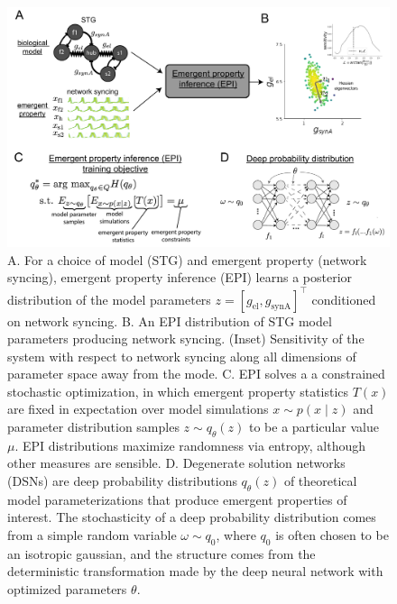 \documentclass[11pt]{article}
\begin{document}

\begin{figure}
\begin{center}
\includegraphics[scale=0.4]{figs/fig2/fig2.pdf}
\end{center}
\caption{A. For a choice of model (STG) and emergent property (network syncing), emergent property inference (EPI) learns a posterior distribution of the model parameters  $z = \left[g_{\text{el}}, g_{\text{synA}} \right]^\top$ conditioned on network syncing. B. An EPI distribution of STG model parameters producing network syncing.  (Inset) Sensitivity of the system with respect to network syncing along all dimensions of parameter space away from the mode.  C. EPI solves a  a constrained stochastic optimization, in which emergent property statistics $T(x)$ are fixed in expectation over model simulations $x \sim p(x \mid z)$ and parameter distribution samples $z \sim q_\theta(z)$ to be a particular value $\mu$.  EPI distributions maximize randomness via entropy, although other measures are sensible.  D. Degenerate solution networks (DSNs) are deep probability distributions $q_\theta(z)$ of theoretical model parameterizations that produce emergent properties of interest.  The stochasticity of a deep probability distribution comes from a simple random variable $\omega \sim q_0$, where $q_0$ is often chosen to be an isotropic gaussian, and the structure comes from the deterministic transformation made by the deep neural network with optimized parameters $\theta$. }
\end{figure}
\end{document}
